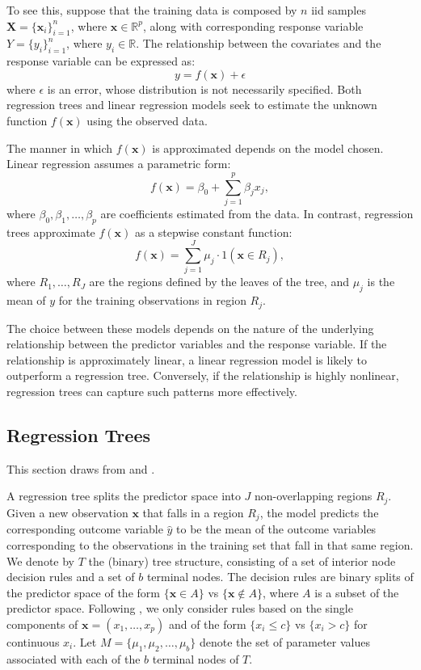 \documentclass[a4paper,11pt]{article}
\begin{document}
To see this, suppose that the training data is composed by $n$ iid samples
\(\mathbf{X} = \{\mathbf{x}_i\}_{i=1}^n\), where \(\mathbf{x} \in \mathbb{R}^p\), 
along with corresponding response variable
\(Y = \{y_i\}_{i=1}^n\), where \(y_i \in \mathbb{R}\). The relationship between the covariates and the response variable can be expressed as:
\begin{equation}
y = f(\mathbf{x}) + \epsilon \label{regression}
\end{equation}
where \( \epsilon \) is an error, whose distribution is not necessarily specified. Both regression trees and linear regression models seek to estimate the unknown function \( f(\mathbf{x}) \) using the observed data.

The manner in which \( f(\mathbf{x}) \) is approximated depends on the model chosen. Linear regression assumes a parametric form:
\[
f(\mathbf{x}) = \beta_0 + \sum_{j=1}^p \beta_jx_j ,
\]
where \( \beta_0, \beta_1, \ldots, \beta_p \) are coefficients estimated from the data. In contrast, regression trees approximate \( f(\mathbf{x}) \) as a stepwise constant function:
\[
f(\mathbf{x}) = \sum_{j=1}^J \mu_j \cdot 1(\mathbf{x}\in R_j),
\]
where \( R_1, \ldots, R_J \) are the regions defined by the leaves of the tree, and \( \mu_j \) is the mean of \( y \) for the training observations in region \( R_j \).

The choice between these models depends on the nature of the underlying relationship between the predictor variables and the response variable. If the relationship is approximately linear, a linear regression model is likely to outperform a regression tree. Conversely, if the relationship is highly nonlinear, regression trees can capture such patterns more effectively. 

\subsection{Regression Trees}

This section draws from \cite[Chapter~8]{jamesIntroductionStatisticalLearning2021} and \cite{Genuer_Poggi_2020}.

A regression tree splits the predictor space into $J$ non-overlapping regions $R_j$. Given a new observation $\mathbf{x}$ that falls in a region $R_j$, the model predicts the corresponding outcome variable $\hat{y}$ to be the mean of the outcome variables corresponding to the observations in the training set that fall in that same region.
 We denote by \( T \) the (binary) tree structure, consisting of a set of interior node decision rules and a set of $b$ terminal nodes. The decision rules are binary splits of the predictor space of the form \( \{\mathbf{x} \in A\} \) vs \( \{\mathbf{x} \notin A\} \), where \( A \) is a subset of the predictor space. Following  \cite{chipmanBARTBayesianAdditive2010}, we only consider rules based on the single components of \( \mathbf{x} = (x_1, \dots, x_p) \) and of the form \( \{x_i \leq c\} \) vs \( \{x_i > c\} \) for continuous \( x_i \). Let \( M = \{\mu_1, \mu_2, \dots, \mu_b\} \) denote the set of parameter values associated with each of the \( b \) terminal nodes of \( T \). 
\end{document}
